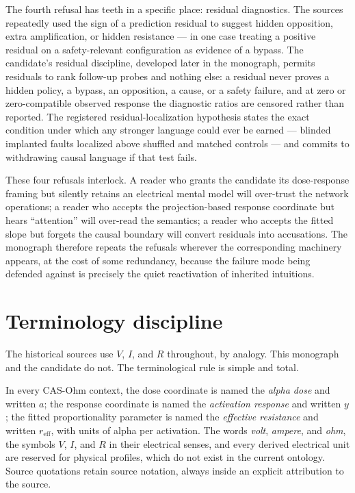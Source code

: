 The fourth refusal has teeth in a specific place: residual diagnostics. The sources repeatedly used the sign of a prediction residual to suggest hidden opposition, extra amplification, or hidden resistance --- in one case treating a positive residual on a safety-relevant configuration as evidence of a bypass. The candidate's residual discipline, developed later in the monograph, permits residuals to rank follow-up probes and nothing else: a residual never proves a hidden policy, a bypass, an opposition, a cause, or a safety failure, and at zero or zero-compatible observed response the diagnostic ratios are censored rather than reported. The registered residual-localization hypothesis states the exact condition under which any stronger language could ever be earned --- blinded implanted faults localized above shuffled and matched controls --- and commits to withdrawing causal language if that test fails.

These four refusals interlock. A reader who grants the candidate its dose-response framing but silently retains an electrical mental model will over-trust the network operations; a reader who accepts the projection-based response coordinate but hears ``attention'' will over-read the semantics; a reader who accepts the fitted slope but forgets the causal boundary will convert residuals into accusations. The monograph therefore repeats the refusals wherever the corresponding machinery appears, at the cost of some redundancy, because the failure mode being defended against is precisely the quiet reactivation of inherited intuitions.

\section{Terminology discipline}\label{ch01:terminology}

The historical sources use $V$, $I$, and $R$ throughout, by analogy. This monograph and the candidate do not. The terminological rule is simple and total.

\begin{ruleenv}\label{ch01:rule:terminology}
In every CAS-Ohm context, the dose coordinate is named the \emph{alpha dose} and written $a$; the response coordinate is named the \emph{activation response} and written $y$; the fitted proportionality parameter is named the \emph{effective resistance} and written $r_{\mathrm{eff}}$, with units of alpha per activation. The words \emph{volt}, \emph{ampere}, and \emph{ohm}, the symbols $V$, $I$, and $R$ in their electrical senses, and every derived electrical unit are reserved for physical profiles, which do not exist in the current ontology. Source quotations retain source notation, always inside an explicit attribution to the source.
\end{ruleenv}

